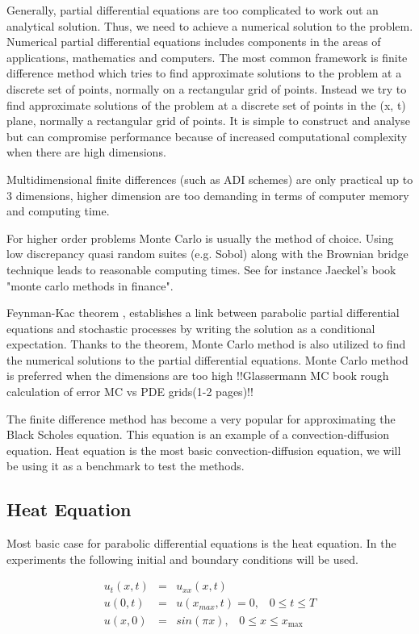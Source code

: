 \documentclass[12pt, oneside]{book}
\theoremstyle{plain}
\theoremstyle{definition}
\begin{document}
Generally, partial differential equations are too complicated to work out an analytical solution. Thus, we need to achieve a numerical solution to the problem. Numerical partial differential equations includes components in the areas of applications, mathematics and computers. The most common framework is finite difference method which tries to find approximate solutions to the problem at a discrete set of points, normally on a rectangular grid of points. Instead we try to find approximate solutions of the problem at a discrete set of points in the (x, t) plane, normally a rectangular grid of points. It is simple to construct and analyse but can compromise performance because of increased computational complexity when there are high dimensions. 

Multidimensional finite differences (such as ADI schemes) are only practical up to 3 dimensions, higher dimension are too demanding in terms of computer memory and computing time.

For higher order problems Monte Carlo is usually the method of choice. Using low discrepancy quasi random suites (e.g. Sobol) along with the Brownian bridge technique leads to reasonable computing times. See for instance Jaeckel's book "monte carlo methods in finance".

Feynman-Kac theorem \cite{klebaner}, establishes a link between parabolic partial differential equations and stochastic processes by writing the solution as a conditional expectation. Thanks to the theorem, Monte Carlo method is also utilized to find the numerical solutions to the partial differential equations.  Monte Carlo method is preferred when the dimensions are too high !!Glassermann MC book rough calculation of error MC vs PDE grids(1-2 pages)!!

The finite difference method has become a very popular for approximating the Black Scholes equation. This equation is an example of a convection-diffusion equation. Heat equation is the most basic convection-diffusion equation, we will be using it as a benchmark to test the methods. 

\subsection{Heat Equation}
Most basic case for parabolic differential equations is the heat equation. In the experiments the following initial and boundary conditions will be used.

\begin{eqnarray}
u_t(x,t) &=& u_{xx}(x, t) \\[10pt]
u(0, t) &=& u(x_{max}, t) = 0, \hspace{10pt} 0 \leq t \leq T \\[10pt]
u(x, 0) &=& sin(\pi x), \hspace{10pt} 0 \leq x \leq x_{\max}
\end{eqnarray}
\end{document}
